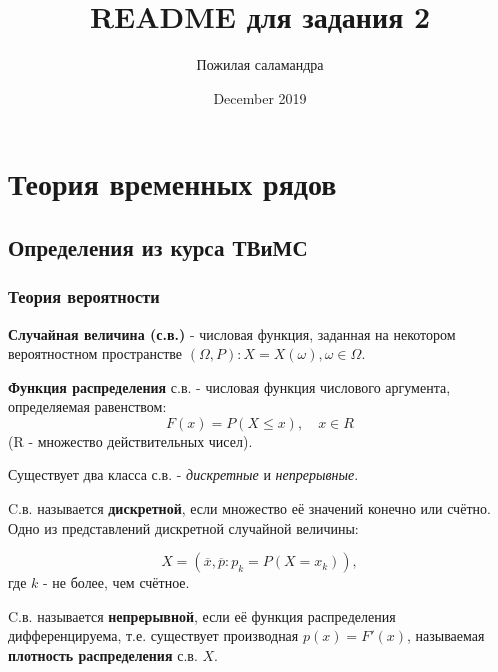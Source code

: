 \documentclass{article}
\title{README для задания 2}
\author{Пожилая саламандра}
\date{December 2019}
\begin{document}
\maketitle

\tableofcontents
\newpage

\section{Теория временных рядов}
  
  \subsection{Определения из курса ТВиМС}
  
    \subsubsection{Теория вероятности}
     
      \textbf{Случайная величина (с.в.)} - числовая функция, заданная на некотором вероятностном пространстве $(\Omega, P): X = X(\omega), \omega \in \Omega.$\par
      
      \textbf{Функция распределения} с.в. - числовая функция числового аргумента, определяемая равенством:
      \begin{equation}
        F(x) = P(X \leq x), \quad x \in R
      \end{equation}
      (R - множество действительных чисел).\par
      
      Существует два класса с.в. - \textsl{дискретные} и \textsl{непрерывные}.\par
      
      C.в. называется \textbf{дискретной}, если множество её значений конечно или счётно. Одно из представлений дискретной случайной величины:
      
      \begin{equation}
        X = (\overline{x}, \overline{p} : p_k = P(X = x_k)),
      \end{equation}
      где $k$ - не более, чем счётное.\par
      
      C.в. называется \textbf{непрерывной}, если её функция распределения дифференцируема, т.е. существует производная $p(x) = F'(x)$, называемая \textbf{плотность распределения} с.в. $X$.\par
      
\end{document}
